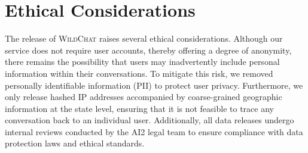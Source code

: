 \documentclass{article} %
\newcommand{\corpus}{\textsc{WildChat}\xspace}
\begin{document}









\section{Ethical Considerations}
The release of \corpus raises several ethical considerations. %
Although our service does not require user accounts, thereby offering a degree of anonymity, there remains the possibility that users may inadvertently include personal information within their conversations. To mitigate this risk, we removed personally identifiable information (PII) to protect user privacy. Furthermore, we only release hashed IP addresses accompanied by coarse-grained geographic information at the state level, ensuring that it is not feasible to trace any conversation back to an individual user.
Additionally, all data releases undergo internal reviews conducted by the AI2 legal team to ensure compliance with data protection laws and ethical standards.
\end{document}
